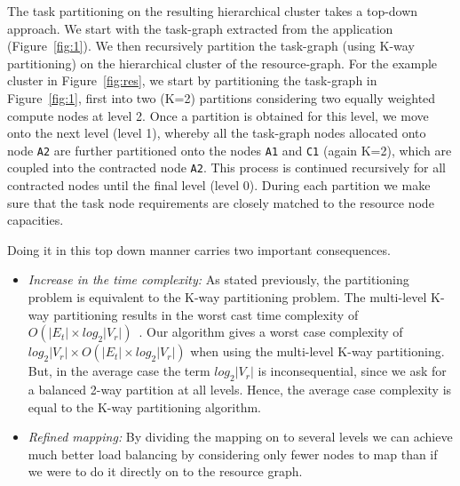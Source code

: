 The task partitioning on the resulting hierarchical cluster takes a
top-down approach. We start with the task-graph extracted from the
application (Figure~\ref{fig:1}). We then recursively partition the
task-graph (using K-way partitioning) on the hierarchical cluster of the
resource-graph. For the example cluster in Figure~\ref{fig:res}, we
start by partitioning the task-graph in Figure~\ref{fig:1}, first into
two (K=2) partitions considering two equally weighted compute nodes at
level 2. Once a partition is obtained for this level, we move onto the
next level (level 1), whereby all the task-graph nodes allocated onto
node \texttt{A2} are further partitioned onto the nodes \texttt{A1} and
\texttt{C1} (again K=2), which are coupled into the contracted node
\texttt{A2}. This process is continued recursively for all contracted
nodes until the final level (level 0). During each partition we make
sure that the task node requirements are closely matched to the resource
node capacities.


Doing it in this top down manner carries two important consequences.

\begin{itemize}

\item \textit{Increase in the time complexity:} As stated previously,
  the partitioning problem is equivalent to the K-way partitioning
  problem. The multi-level K-way partitioning results in the worst cast
  time complexity of $O(|E_t| \times log_2|V_r|)$~\cite{gkar98}. Our
  algorithm gives a worst case complexity of \mbox{$log_2|V_r| \times
    O(|E_t| \times log_2 |V_r|)$} when using the multi-level K-way
  partitioning. But, in the average case the term $log_2|V_r|$ is
  inconsequential, since we ask for a balanced 2-way partition at all
  levels. Hence, the average case complexity is equal to the K-way
  partitioning algorithm.

\item \textit{Refined mapping:} By dividing the mapping on to several
  levels we can achieve much better load balancing by considering only
  fewer nodes to map than if we were to do it directly on to the
  resource graph. %

\end{itemize}


